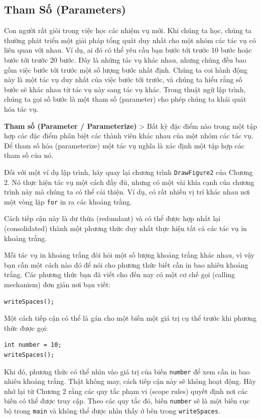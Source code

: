 \subsection{Tham Số (Parameters)}\label{tham-sux1ed1-parameters-1}

Con người rất giỏi trong việc học các nhiệm vụ mới. Khi chúng ta học,
chúng ta thường phát triển một giải pháp tổng quát duy nhất cho một nhóm
các tác vụ có liên quan với nhau. Ví dụ, ai đó có thể yêu cầu bạn bước
tới trước 10 bước hoặc bước tới trước 20 bước. Đây là những tác vụ khác
nhau, nhưng chúng đều bao gồm việc bước tới trước một số lượng bước nhất
định. Chúng ta coi hành động này là một tác vụ duy nhất của việc bước
tới trước, và chúng ta hiểu rằng số bước sẽ khác nhau từ tác vụ này sang
tác vụ khác. Trong thuật ngữ lập trình, chúng ta gọi số bước là một tham
số (parameter) cho phép chúng ta khái quát hóa tác vụ.

\textbf{Tham số (Parameter / Parameterize)} \textgreater{} Bất kỳ đặc
điểm nào trong một tập hợp các đặc điểm phân biệt các thành viên khác
nhau của một nhóm các tác vụ. Để tham số hóa (parameterize) một tác vụ
nghĩa là xác định một tập hợp các tham số của nó.

Đối với một ví dụ lập trình, hãy quay lại chương trình
\texttt{DrawFigure2} của Chương 2. Nó thực hiện tác vụ một cách đầy đủ,
nhưng có một vài khía cạnh của chương trình này mà chúng ta có thể cải
thiện. Ví dụ, có rất nhiều vị trí khác nhau nơi một vòng lặp
\texttt{for} in ra các khoảng trắng.

Cách tiếp cận này là dư thừa (redundant) và có thể được hợp nhất lại
(consolidated) thành một phương thức duy nhất thực hiện tất cả các tác
vụ in khoảng trắng.

Mỗi tác vụ in khoảng trắng đòi hỏi một số lượng khoảng trắng khác nhau,
vì vậy bạn cần một cách nào đó để nói cho phương thức biết cần in bao
nhiêu khoảng trắng. Các phương thức bạn đã viết cho đến nay có một cơ
chế gọi (calling mechanism) đơn giản nơi bạn viết:

\begin{verbatim}
writeSpaces();
\end{verbatim}

Một cách tiếp cận có thể là gán cho một biến một giá trị cụ thể trước
khi phương thức được gọi:

\begin{verbatim}
int number = 10;
writeSpaces();
\end{verbatim}

Khi đó, phương thức có thể nhìn vào giá trị của biến \texttt{number} để
xem cần in bao nhiêu khoảng trắng. Thật không may, cách tiếp cận này sẽ
không hoạt động. Hãy nhớ lại từ Chương 2 rằng các quy tắc phạm vi (scope
rules) quyết định nơi các biến có thể được truy cập. Theo các quy tắc
đó, biến \texttt{number} sẽ là một biến cục bộ trong \texttt{main} và
không thể được nhìn thấy ở bên trong \texttt{writeSpaces}.

